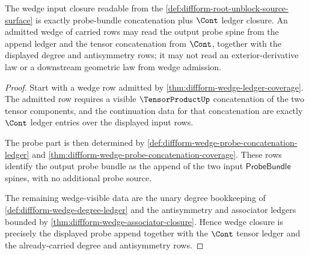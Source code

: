 \begin{theorem}
\label{thm:diffform-root-unblock-wedge-cont-closure}
The wedge input closure readable from the
\autoref{def:diffform-root-unblock-source-surface} is exactly probe-bundle
concatenation plus $\Cont$ ledger closure. An admitted wedge of carried rows
may read the output probe spine from the append ledger and the tensor
concatenation from $\Cont$, together with the displayed degree and
antisymmetry rows; it may not read an exterior-derivative law or a downstream
geometric law from wedge admission.
\end{theorem}
\begin{proof}
Start with a wedge row admitted by
\autoref{thm:diffform-wedge-ledger-coverage}. The admitted row requires a
visible $\TensorProductUp$ concatenation of the two tensor components, and the
continuation data for that concatenation are exactly $\Cont$ ledger entries
over the displayed input rows.

The probe part is then determined by
\autoref{def:diffform-wedge-probe-concatenation-ledger} and
\autoref{thm:diffform-wedge-probe-concatenation-coverage}. These rows identify
the output probe bundle as the append of the two input $\mathsf{ProbeBundle}$
spines, with no additional probe source.

The remaining wedge-visible data are the unary degree bookkeeping of
\autoref{def:diffform-wedge-degree-ledger} and the antisymmetry and associator
ledgers bounded by \autoref{thm:diffform-wedge-associator-closure}. Hence
wedge closure is precisely the displayed probe append together with the
$\Cont$ tensor ledger and the already-carried degree and antisymmetry rows.
\end{proof}

